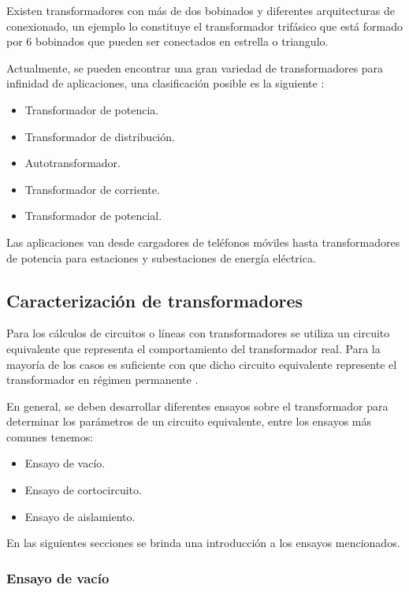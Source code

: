 
Existen transformadores con más de dos bobinados y diferentes arquitecturas de conexionado, un ejemplo lo constituye el transformador trifásico que está formado por 6 bobinados que pueden ser conectados en estrella o triangulo.

Actualmente, se pueden encontrar una gran variedad de transformadores para infinidad de aplicaciones, una clasificación posible es la siguiente \citep{TRAFO_APL}:

\begin{itemize}
\item Transformador de potencia.
\item Transformador de distribución.
\item Autotransformador.
\item Transformador de corriente.
\item Transformador de potencial.
\end{itemize}

Las aplicaciones van desde cargadores de teléfonos móviles hasta transformadores de potencia para estaciones y subestaciones de energía eléctrica.

\subsection{Caracterización de transformadores}

Para los cálculos de circuitos o líneas con transformadores se utiliza un circuito equivalente que representa el comportamiento del transformador real. Para la mayoría de los casos es suficiente con que dicho circuito equivalente represente el transformador en régimen permanente \citep{TRAFO_WIKI}. 

En general, se deben desarrollar diferentes ensayos sobre el transformador para determinar los parámetros de un circuito equivalente, entre los ensayos más comunes tenemos:

\begin{itemize}
\item Ensayo de vacío.
\item Ensayo de cortocircuito.
\item Ensayo de aislamiento.
\end{itemize}

En las siguientes secciones se brinda una introducción a los ensayos mencionados.

\subsubsection{Ensayo de vacío}

